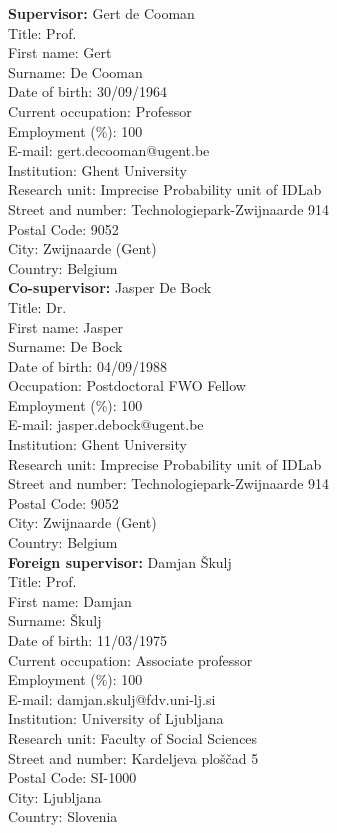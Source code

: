 \documentclass[11pt,dvipsnames,usenames,a4paper]{article}
\begin{document}
\textbf{Supervisor:} Gert de Cooman\\
Title: Prof.\\
First name: Gert\\
Surname: De Cooman\\
Date of birth: 30/09/1964\\
Current occupation: Professor\\
Employment (\%): 100\\
E-mail: gert.decooman@ugent.be\\
Institution: Ghent University\\
Research unit: Imprecise Probability unit of IDLab\\
Street and number: Technologiepark-Zwijnaarde 914\\
Postal Code: 9052\\
City: Zwijnaarde (Gent)\\
Country: Belgium\\[7pt]
\textbf{Co-supervisor:} Jasper De Bock\\
Title: Dr.\\
First name: Jasper\\
Surname: De Bock\\
Date of birth: 04/09/1988\\
Occupation: Postdoctoral FWO Fellow\\
Employment (\%): 100\\
E-mail: jasper.debock@ugent.be\\
Institution: Ghent University\\
Research unit: Imprecise Probability unit of IDLab\\
Street and number: Technologiepark-Zwijnaarde 914\\
Postal Code: 9052\\
City: Zwijnaarde (Gent)\\
Country: Belgium\\[7pt]

\newpage
\textbf{Foreign supervisor:} Damjan {\v S}kulj\\
Title: Prof.\\
First name: Damjan\\
Surname: {\v S}kulj\\
Date of birth: {11/03/1975}\\
Current occupation: {Associate professor}\\
Employment (\%): {100}\\
E-mail: {damjan.skulj@fdv.uni-lj.si}\\
Institution: University of Ljubljana\\
Research unit: {Faculty of Social Sciences}\\
Street and number: {Kardeljeva plo\v s\v cad 5}\\
Postal Code: {SI-1000}\\
City: {Ljubljana}\\
Country: {Slovenia}\\%
\end{document}

